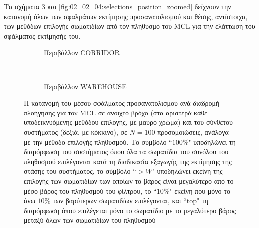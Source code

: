 Τα σχήματα \ref{fig:02_02_04:selections_orientation_zoomed} και
\ref{fig:02_02_04:selections_position_zoomed} δείχνουν την κατανομή όλων των
σφαλμάτων εκτίμησης προσανατολισμού και θέσης, αντίστοιχα, των μεθόδων επιλογής
σωματιδίων από τον πληθυσμό του MCL για την ελάττωση του σφάλματος εκτίμησής
του.

\begin{figure}
  \vspace{2cm}
  \begin{subfigure}{\linewidth}
  \hspace{-1.25cm}
    
    \vspace{0.3cm}
    \caption{\small Περιβάλλον CORRIDOR}
    \label{}
  \end{subfigure}\\
  \begin{subfigure}{\linewidth}\vspace{0.5cm}
    \hspace{-1.25cm}
    
    \vspace{0.3cm}
    \caption{\small Περιβάλλον WAREHOUSE}
    \label{}
    \end{subfigure}
\caption{\small Η κατανομή του μέσου σφάλματος προσανατολισμού ανά διαδρομή
         πλοήγησης για τον MCL σε ανοιχτό βρόχο (στα αριστερά κάθε
         υποδεικνυόμενης μεθόδου επιλογής, με μαύρο χρώμα) και του σύνθετου
         συστήματος (δεξιά, με κόκκινο), σε $N=100$ προσομοιώσεις, ανάλογα με
         την μέθοδο επιλογής πληθυσμού. Το σύμβολο ``$100\%$" υποδηλώνει τη
         διαμόρφωση του συστήματος όπου όλα τα σωματίδια του συνόλου του
         πληθυσμού επιλέγονται κατά τη διαδικασία εξαγωγής της εκτίμησης της
         στάσης του συστήματος, το σύμβολο ``$>\overline{W}$" υποδηλώνει εκείνη
         της επιλογής των σωματιδίων των οποίων το βάρος είναι μεγαλύτερο από
         το μέσο βάρος του πληθυσμού του φίλτρου, το ``$10\%$" εκείνη που μόνο
         το άνω $10\%$ των βαρύτερων σωματιδίων επιλέγονται, και ``top" τη
         διαμόρφωση όπου επιλέγεται μόνο το σωματίδιο με το μεγαλύτερο βάρος
         μεταξύ όλων των σωματιδίων του πληθυσμού}
\label{fig:02_02_04:selections_orientation_zoomed}
\end{figure}


